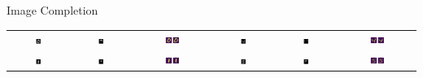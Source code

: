 \documentclass{beamer}
\begin{document}
    \begin{frame}{Image Completion}
        \begin{tabular}{cccccc}
             \includegraphics[width=0.1\textwidth]{images/0.png} & \includegraphics[width=0.1\textwidth]{images/0.5.png} & \includegraphics[width=0.2\textwidth]{images/pred0.png} & \includegraphics[width=0.1\textwidth]{images/4.png} & \includegraphics[width=0.1\textwidth]{images/4.5.png} & \includegraphics[width=0.2\textwidth]{images/pred4.png}\\
             \includegraphics[width=0.1\textwidth]{images/1.png} & \includegraphics[width=0.1\textwidth]{images/1.5.png} & \includegraphics[width=0.2\textwidth]{images/pred1.png} & \includegraphics[width=0.1\textwidth]{images/5.png} & \includegraphics[width=0.1\textwidth]{images/5.5.png} & \includegraphics[width=0.2\textwidth]{images/pred5.png}\\

\end{tabular}
\end{frame}
\end{document}
